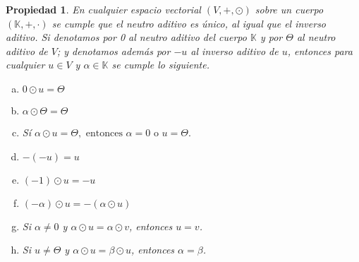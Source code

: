\documentclass[12pt]{book}
\newtheorem{prop}{Propiedad}
\def\K{\mathbb{K}}
\begin{document}
\begin{prop}
En cualquier espacio vectorial $(V,+,\odot)$ sobre un cuerpo $(\K,+,\cdot)$ se cumple que el neutro aditivo es \'unico, al igual que el inverso aditivo.
Si denotamos por 0 al neutro aditivo del cuerpo $\K$ y por $\Theta$ al neutro aditivo de $V$; y denotamos adem\'as por $-u$ al inverso aditivo de $u$, entonces para cualquier $u\in V$ y $\alpha \in \K$ se cumple lo siguiente.

\begin{multicols}{2}
\begin{enumerate}[a)]
\item $0\odot u=\Theta$
\item\label{a0} $\alpha\odot\Theta=\Theta$
\item\label{integridad} Sí $\alpha\odot u=\Theta, \textrm{ entonces } \alpha=0 \textrm{ o } u=\Theta.$
\item $-(-u)=u$
\item $(-1)\odot u=-u$
\item\label{-au} $(-\alpha)\odot u=-(\alpha\odot u)$
\item Si $\alpha\not =0$ y $\alpha\odot u=\alpha\odot v$, entonces $u=v$.
\item\label{cancela_u} Si $u\not =\Theta$ y $\alpha\odot u=\beta\odot u$, entonces $\alpha=\beta$.
\end{enumerate}
\end{multicols}
\end{prop}
\end{document}
